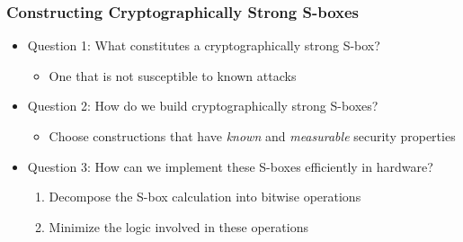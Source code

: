 \documentclass[handout,10pt]{beamer}
\begin{document}
\begin{frame}
	\frametitle{Constructing Cryptographically Strong S-boxes}
	\begin{itemize}
		\item Question 1: What constitutes a cryptographically strong S-box?
		\pause
		\medskip
		\begin{itemize}
			\item One that is not susceptible to known attacks
		\end{itemize}
		\pause
		\medskip
		\item Question 2: How do we build cryptographically strong S-boxes?
		\pause
		\medskip
		\begin{itemize}
			\item Choose constructions that have \emph{known} and \emph{measurable} security properties
		\end{itemize}
		\pause
		\medskip
		\item Question 3: How can we implement these S-boxes efficiently in hardware?
		\pause
		\medskip
		\begin{enumerate}
			\item Decompose the S-box calculation into bitwise operations
			\item Minimize the logic involved in these operations
		\end{enumerate}
	\end{itemize}
\end{frame}


\end{document}
